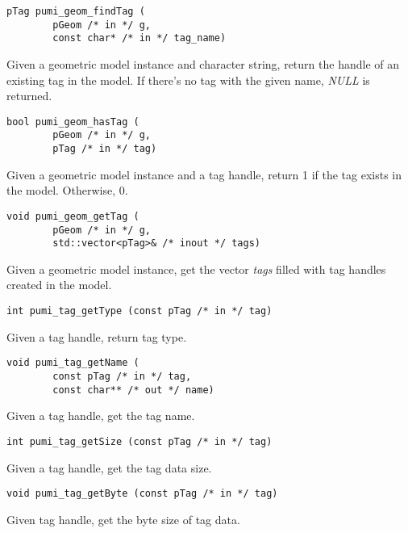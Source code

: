 \begin{verbatim}
pTag pumi_geom_findTag (
        pGeom /* in */ g, 
        const char* /* in */ tag_name)
\end{verbatim}\vspace{-.5cm}\hspace{1cm}
        Given a geometric model instance and character string, return the handle of an existing tag in the model. If there's no tag with the given name, \emph{NULL} is returned.

\begin{verbatim}
bool pumi_geom_hasTag (
        pGeom /* in */ g, 
        pTag /* in */ tag)
\end{verbatim}\vspace{-.5cm}\hspace{1cm}
        Given a geometric model instance and a tag handle, return 1 if the tag exists in the model. Otherwise, 0.

\begin{verbatim}
void pumi_geom_getTag (
        pGeom /* in */ g, 
        std::vector<pTag>& /* inout */ tags)
\end{verbatim}\vspace{-.5cm}\hspace{1cm}
        Given a geometric model instance, get the vector \emph{tags} filled with tag handles created in the model.


\begin{verbatim}
int pumi_tag_getType (const pTag /* in */ tag)
\end{verbatim}\vspace{-.5cm}\hspace{1cm}
       Given a tag handle, return tag type. 

\begin{verbatim}
void pumi_tag_getName (
        const pTag /* in */ tag, 
        const char** /* out */ name)
\end{verbatim}\vspace{-.5cm}\hspace{1cm}
       Given a tag handle, get the tag name.

\begin{verbatim}
int pumi_tag_getSize (const pTag /* in */ tag)
\end{verbatim}\vspace{-.5cm}\hspace{1cm}
       Given a tag handle, get the tag data size.

\begin{verbatim}
void pumi_tag_getByte (const pTag /* in */ tag)
\end{verbatim}\vspace{-.5cm}\hspace{1cm}
       Given tag handle, get the byte size of tag data.

